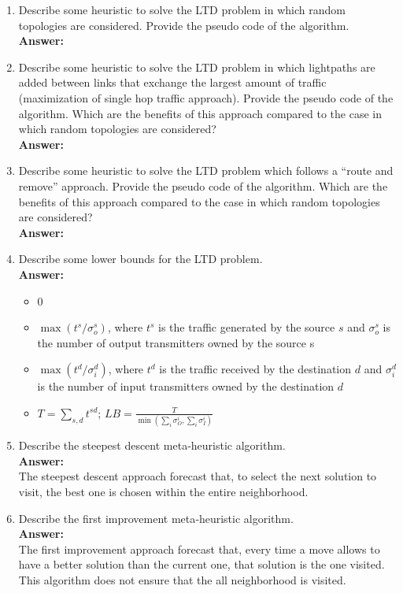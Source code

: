 \documentclass[a4paper]{article}
\begin{document}
\begin{enumerate}
\item Describe some heuristic to solve the LTD problem in which random topologies are considered. Provide the pseudo code of the algorithm. \\ 
\textbf{Answer:}

\item Describe some heuristic to solve the LTD problem in which lightpaths are added between links that exchange the largest amount of traffic (maximization of single hop traffic approach). Provide  the pseudo code  of the algorithm. Which are the benefits of this approach compared to the case in which random topologies are considered? \\
\textbf{Answer:}

\item Describe  some  heuristic  to  solve  the  LTD  problem  which  follows  a  “route and remove” approach.  Provide  the  pseudo  code  of  the  algorithm.  Which   are  the benefits  of  this  approach  compared  to  the  case  in  which  random   topologies  are considered?\\
\textbf{Answer:}

\item Describe  some  lower  bounds  for  the  LTD  problem.\\
\textbf{Answer:}
\begin{itemize}
	\item 0
	\item $\max({t^{s}/\sigma_o^{s}})$, where $t^{s}$ is the traffic generated by the source $s$ and $\sigma_o^{s}$ is the number of output transmitters owned by the source s
	\item $\max{(t^d/\sigma_i^d)}$, where $t^{d}$ is the traffic received  by the destination $d$ and $\sigma_i^d$ is the number of input transmitters owned by the destination $d$
	\item $T= \sum_{s,d} {t^{sd}}$;
	$LB= \frac{T} { \min{ (\sum_{i}{\sigma_O^i} , \sum_{i} {\sigma_I^i} ) }}$ 
\end{itemize}

\item Describe  the  steepest  descent  meta-­heuristic  algorithm.\\
\textbf{Answer:}\\
The steepest descent approach forecast that, to select the next solution to visit, the best one is chosen within the entire neighborhood.

\item Describe  the  first  improvement  meta‐heuristic  algorithm.\\
\textbf{Answer:}\\
The first improvement approach forecast that, every time a move allows to have a better solution than the current one, that solution is the one visited. This algorithm does not ensure that the all neighborhood is visited.


\end{enumerate}
\end{document}
